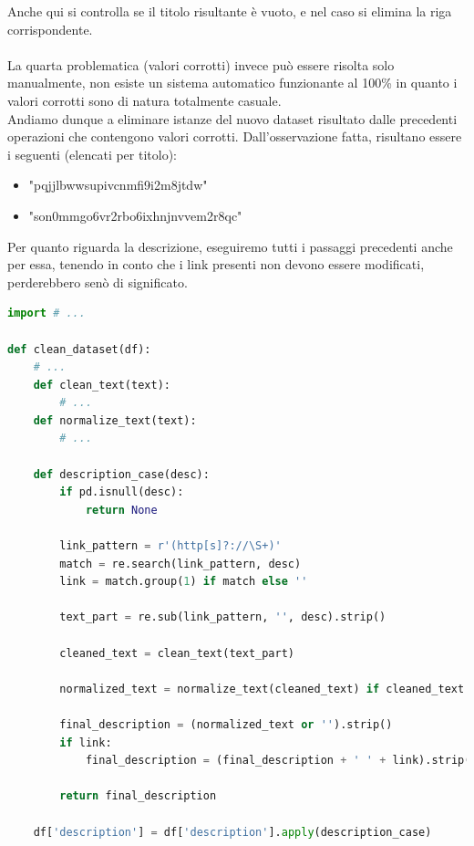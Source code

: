 \documentclass[a4paper,12pt]{report}
\begin{document}
\hfill \break
Anche qui si controlla se il titolo risultante è vuoto, e nel caso si elimina la riga corrispondente.
\\
\\
La quarta problematica (valori corrotti) invece può essere risolta solo manualmente, non esiste un sistema automatico funzionante al 100\% in quanto i valori corrotti sono di natura totalmente casuale.\\
Andiamo dunque a eliminare istanze del nuovo dataset risultato dalle precedenti operazioni che contengono valori corrotti. Dall'osservazione fatta, risultano essere i seguenti (elencati per titolo):
\begin{itemize}
    \item "pqjjlbwwsupivcnmfi9i2m8jtdw"
    \item "son0mmgo6vr2rbo6ixhnjnvvem2r8qc"
\end{itemize}
\newpage
Per quanto riguarda la descrizione, eseguiremo tutti i passaggi precedenti anche per essa, tenendo in conto che i link presenti non devono essere modificati, perderebbero senò di significato.
\\
\begin{lstlisting}[language=Python]
import # ...

def clean_dataset(df):
    # ...
    def clean_text(text):
        # ...
    def normalize_text(text):
        # ...

    def description_case(desc):
        if pd.isnull(desc):
            return None

        link_pattern = r'(http[s]?://\S+)'
        match = re.search(link_pattern, desc)
        link = match.group(1) if match else ''

        text_part = re.sub(link_pattern, '', desc).strip()

        cleaned_text = clean_text(text_part)

        normalized_text = normalize_text(cleaned_text) if cleaned_text else None

        final_description = (normalized_text or '').strip()
        if link:
            final_description = (final_description + ' ' + link).strip()

        return final_description

    df['description'] = df['description'].apply(description_case)
\end{lstlisting}
\newpage
\end{document}
